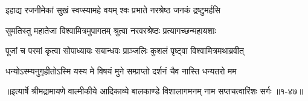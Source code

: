 \twolineshloka
{इहाद्य रजनीमेकां सुखं स्वप्स्यामहे वयम्}
{श्वः प्रभाते नरश्रेष्ठ जनकं द्रष्टुमर्हसि} %

\twolineshloka
{सुमतिस्तु महातेजा विश्वामित्रमुपागतम्}
{श्रुत्वा नरवरश्रेष्ठः प्रत्यागच्छन्महायशाः} %

\twolineshloka
{पूजां च परमां कृत्वा सोपाध्यायः सबान्धवः}
{प्राञ्जलिः कुशलं पृष्ट्वा विश्वामित्रमथाब्रवीत्} %

\twolineshloka
{धन्योऽस्म्यनुगृहीतोऽस्मि यस्य मे विषयं मुने}
{सम्प्राप्तो दर्शनं चैव नास्ति धन्यतरो मम} %


॥इत्यार्षे श्रीमद्रामायणे वाल्मीकीये आदिकाव्ये बालकाण्डे विशालागमनम् नाम सप्तचत्वारिंशः सर्गः ॥१-४७॥
